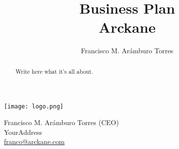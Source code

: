 \documentclass[a4paper,11pt]{article}
\title{Business Plan\\Arckane}
\author{Francisco M. Arámburo Torres}
\begin{document}
\begin{titlepage}
    \centering
    \maketitle
    \thispagestyle{empty}   %
    \texttt{[image: logo.png]}
    \vfill
    {\raggedright
    Francisco M. Arámburo Torres (CEO)\\
    YourAddress\\
    \href{franco@arckane.com}{franco@arckane.com}\\
    }
\end{titlepage}

\begin{abstract}
Write here what it's all about.
\end{abstract}

\pagebreak
\tableofcontents
\pagebreak



\pagebreak


\pagebreak


\pagebreak


\pagebreak





\pagebreak








% 

% 

% 

% 

% 

% 

% 

% 

% 

% 

% 

% 


% 
\end{document}
